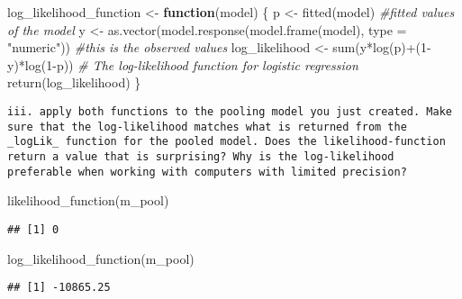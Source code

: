 \documentclass[
]{article}
\newenvironment{Shaded}{\begin{snugshade}}{\end{snugshade}}
\newcommand{\AttributeTok}[1]{\textcolor[rgb]{0.77,0.63,0.00}{#1}}
\newcommand{\CommentTok}[1]{\textcolor[rgb]{0.56,0.35,0.01}{\textit{#1}}}
\newcommand{\ControlFlowTok}[1]{\textcolor[rgb]{0.13,0.29,0.53}{\textbf{#1}}}
\newcommand{\DecValTok}[1]{\textcolor[rgb]{0.00,0.00,0.81}{#1}}
\newcommand{\FunctionTok}[1]{\textcolor[rgb]{0.00,0.00,0.00}{#1}}
\newcommand{\NormalTok}[1]{#1}
\newcommand{\OtherTok}[1]{\textcolor[rgb]{0.56,0.35,0.01}{#1}}
\newcommand{\SpecialCharTok}[1]{\textcolor[rgb]{0.00,0.00,0.00}{#1}}
\newcommand{\StringTok}[1]{\textcolor[rgb]{0.31,0.60,0.02}{#1}}
\begin{document}
\begin{Shaded}
\begin{Highlighting}[]
\NormalTok{log\_likelihood\_function }\OtherTok{\textless{}{-}} \ControlFlowTok{function}\NormalTok{(model) \{}
\NormalTok{  p }\OtherTok{\textless{}{-}} \FunctionTok{fitted}\NormalTok{(model) }\CommentTok{\#fitted values of the model}
\NormalTok{  y }\OtherTok{\textless{}{-}} \FunctionTok{as.vector}\NormalTok{(}\FunctionTok{model.response}\NormalTok{(}\FunctionTok{model.frame}\NormalTok{(model), }\AttributeTok{type =} \StringTok{"numeric"}\NormalTok{)) }\CommentTok{\#this is the observed values}
\NormalTok{  log\_likelihood }\OtherTok{\textless{}{-}} \FunctionTok{sum}\NormalTok{(y}\SpecialCharTok{*}\FunctionTok{log}\NormalTok{(p)}\SpecialCharTok{+}\NormalTok{(}\DecValTok{1}\SpecialCharTok{{-}}\NormalTok{y)}\SpecialCharTok{*}\FunctionTok{log}\NormalTok{(}\DecValTok{1}\SpecialCharTok{{-}}\NormalTok{p)) }\CommentTok{\# The log{-}likelihood function for logistic regression}
  \FunctionTok{return}\NormalTok{(log\_likelihood)}
\NormalTok{\}}
\end{Highlighting}
\end{Shaded}

\begin{verbatim}
iii. apply both functions to the pooling model you just created. Make sure that the log-likelihood matches what is returned from the _logLik_ function for the pooled model. Does the likelihood-function return a value that is surprising? Why is the log-likelihood preferable when working with computers with limited precision?  
\end{verbatim}

\begin{Shaded}
\begin{Highlighting}[]
\FunctionTok{likelihood\_function}\NormalTok{(m\_pool)}
\end{Highlighting}
\end{Shaded}

\begin{verbatim}
## [1] 0
\end{verbatim}

\begin{Shaded}
\begin{Highlighting}[]
\FunctionTok{log\_likelihood\_function}\NormalTok{(m\_pool)}
\end{Highlighting}
\end{Shaded}

\begin{verbatim}
## [1] -10865.25
\end{verbatim}
\end{document}

